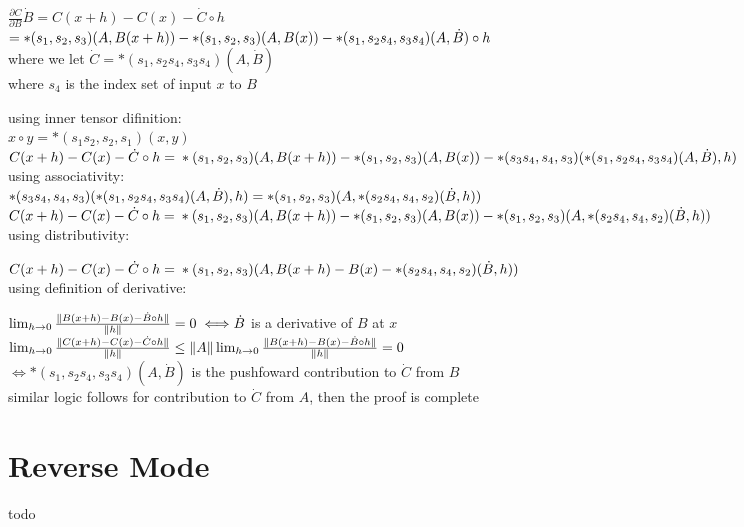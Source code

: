 \documentclass[8pt]{extarticle}
\begin{document}
\begin{multicols*}{2}
  $\frac{\partial C}{\partial B} \dot{B} = C(x+h) - C(x) - \dot{C} \circ h$\\
  $= *(s_1, s_2, s_3)(A, B(x+h))\\
  - *(s_1, s_2, s_3)(A, B(x))\\
  - *(s_1, s_2 s_4, s_3 s_4)(A, \dot{B}) \circ h$\\

  where we let $\dot{C}= *(s_1, s_2 s_4, s_3 s_4)(A,\dot{B})$\\
  where $s_4$ is the index set of input $x$ to $B$

  using inner tensor difinition:\\
  $x \circ y = *(s_1 s_2, s_2, s_1)(x,y)$\\

  $C(x+h) - C(x) - \dot{C} \circ h =\\
  *(s_1, s_2, s_3)(A, B(x+h))\\
  - *(s_1, s_2, s_3)(A, B(x))\\
  - *(s_3 s_4, s_4, s_3)(*(s_1, s_2 s_4, s_3 s_4)(A, \dot{B}), h)$\\

  using associativity:\\
  $*(s_3 s_4, s_4, s_3)(*(s_1, s_2 s_4, s_3 s_4)(A, \dot{B}), h)\\ = *(s_1, s_2, s_3)(A, *(s_2 s_4, s_4, s_2)(\dot{B}, h))$\\

  $C(x+h) - C(x) - \dot{C} \circ h =\\
  *(s_1, s_2, s_3)(A, B(x+h))\\
  - *(s_1, s_2, s_3)(A, B(x))\\
  - *(s_1, s_2, s_3)(A, *(s_2 s_4, s_4, s_2)(\dot{B}, h))$\\

  using distributivity:

  $C(x+h) - C(x) - \dot{C} \circ h =\\
  *(s_1, s_2, s_3)(A, B(x+h) - B(x) - *(s_2 s_4, s_4, s_2)(\dot{B}, h))$\\

  using definition of derivative:

  $\lim_{h \rightarrow 0} \frac{\| B(x+h) - B(x) - \dot{B} \circ h \|}{\|h\|} = 0 \iff \\ \dot{B}$ is a derivative of $B$ at $x$\\

  $\lim_{h \rightarrow 0} \frac{\| C(x+h) - C(x) - \dot{C} \circ h \|}{\|h\|} \\ \leq \|A\| \lim_{h \rightarrow 0} \frac{\| B(x+h) - B(x) - \dot{B} \circ h \|}{\|h\|} = 0$\\
  $\iff *(s_1, s_2 s_4, s_3 s_4)(A, \dot{B})$ is the pushfoward contribution to $\dot{C}$ from $B$\\

  similar logic follows for contribution to $\dot{C}$ from $A$, then the proof is complete
  
  \vfill\null
  \columnbreak
    
  \section{Reverse Mode}
  todo
  
\end{multicols*}
\end{document}
